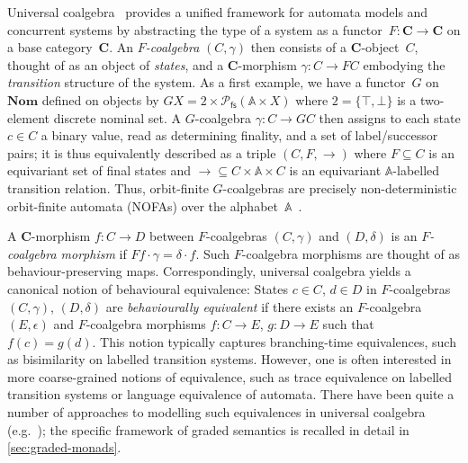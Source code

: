 \documentclass[11pt,a4paper]{amsart}
\newcommand{\fs}{\mathsf{fs}}
\newcommand{\Names}{\mathbb{A}}
\newcommand{\pow}{\mathcal{P}}
\newcommand{\powfs}{\pow_{\fs}}
\theoremstyle{plain}
\numberwithin{equation}{section}
\newcommand{\+}[1]{\mathcal{#1}\xspace}
\newcommand{\Nom}{\mathbf{Nom}}
\newcommand{\BC}{\mathbf{C}}
\theoremstyle{definition}
\begin{document}
Universal coalgebra~\cite{Rutten00} provides a unified framework for
automata models and concurrent systems by abstracting the type of a
system as a functor~$F\colon\BC\to\BC$ on a base category~$\BC$. An
\emph{$F$-coalgebra} $(C,\gamma)$ then consists of a $\BC$-object~$C$,
thought of as an object of \emph{states}, and a $\BC$-morphism
$\gamma\colon C\to FC$ embodying the \emph{transition} structure of
the system. As a first example, we have a functor~$G$ on $\Nom$
defined on objects by $GX=2\times\powfs(\Names\times X)$ where
$2=\{\top,\bot\}$ is a two-element discrete nominal set. A
$G$-coalgebra $\gamma\colon C\to GC$ then assigns to each state
$c\in C$ a binary value, read as determining finality, and a set of
label/successor pairs; it is thus equivalently described as a triple
$(C,F,\to)$ where $F\subseteq C$ is an equivariant set of final states
and ${\to}\subseteq C\times\Names\times C$ is an equivariant
$\Names$-labelled transition relation. Thus, orbit-finite
$G$-coalgebras are precisely non-deterministic orbit-finite automata
(NOFAs) over the alphabet~$\Names$~\cite{BojanczykEA14}.

A $\BC$-morphism $f\colon C\to D$ between $F$-coalgebras $(C,\gamma)$
and $(D,\delta)$ is an \emph{$F$-coalgebra morphism} if
$Ff\cdot\gamma=\delta\cdot f$. Such $F$-coalgebra morphisms are
thought of as behaviour-preserving maps. Correspondingly, universal
coalgebra yields a canonical notion of behavioural equivalence: States
$c\in C$, $d\in D$ in $F$-coalgebras $(C,\gamma)$, $(D,\delta)$ are
\emph{behaviourally equivalent} if there exists an $F$-coalgebra
$(E,\epsilon)$ and $F$-coalgebra morphisms $f\colon C\to E$,
$g\colon D\to E$ such that $f(c)=g(d)$. This notion typically captures
branching-time equivalences, such as bisimilarity on labelled
transition systems. However, one is often interested in more
coarse-grained notions of equivalence, such as trace equivalence on
labelled transition systems or language equivalence of automata. There
have been quite a number of approaches to modelling such equivalences
in universal coalgebra (e.g.~\cite{HasuoEA07,AdamekEA12,MiliusEA15});
the specific framework of graded semantics is recalled in detail in
\cref{sec:graded-monads}.
\end{document}
